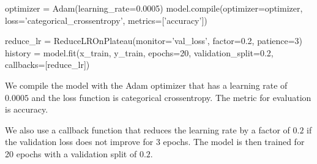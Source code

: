 \begin{python}
optimizer = Adam(learning_rate=0.0005)
model.compile(optimizer=optimizer, loss='categorical_crossentropy', metrics=['accuracy'])

reduce_lr = ReduceLROnPlateau(monitor='val_loss', factor=0.2, patience=3)
history = model.fit(x_train, y_train, epochs=20, validation_split=0.2, callbacks=[reduce_lr])
\end{python}

We compile the model with the Adam optimizer that has a learning rate of $0.0005$ and the loss function is categorical crossentropy. The metric for evaluation is accuracy.
\par
We also use a callback function that reduces the learning rate by a factor of $0.2$ if the validation loss does not improve for $3$ epochs. The model is then trained for 20 epochs with a validation split of $0.2$. 